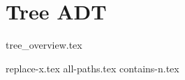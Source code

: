 \documentclass{exam}
\begin{document}
\newpage
\section{Tree ADT}
{tree_overview.tex}
\begin{questions}
    {replace-x.tex}
    {all-paths.tex}
    {contains-n.tex}
\end{questions}
\end{document}

